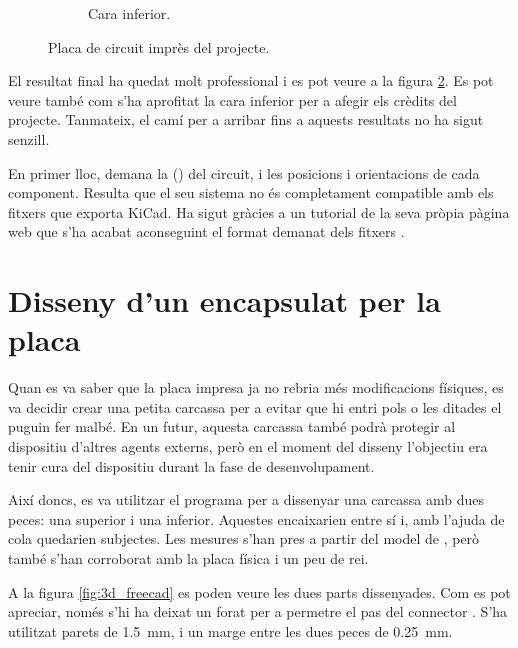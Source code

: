 \begin{figure}[ht]
\begin{subfigure}{0.45\textwidth}
        \caption{Cara inferior.}
        \label{fig:printedpcb_bottom}
    \end{subfigure}
    \caption{Placa de circuit imprès del projecte.}
    \label{fig:printedpcb}
\end{figure}

El resultat final ha quedat molt professional i es pot veure a la figura
\ref{fig:printedpcb}. Es pot veure també com s'ha aprofitat la cara inferior
per a afegir els crèdits del projecte. Tanmateix, el camí per a arribar fins
a aquests resultats no ha sigut senzill.

En primer lloc,  demana la  ()
del circuit, i les posicions i orientacions de cada component. Resulta que el
seu sistema no és completament compatible amb els fitxers que exporta
KiCad. Ha sigut gràcies a un tutorial de la seva pròpia pàgina web que s'ha
acabat aconseguint el format demanat dels fitxers \cite{KiCADJLC}.

\section{Disseny d'un encapsulat per la placa}

Quan es va saber que la placa impresa ja no rebria més modificacions físiques,
es va decidir crear una petita carcassa per a evitar que hi entri pols o les
ditades el puguin fer malbé. En un futur, aquesta carcassa també podrà protegir
al dispositiu d'altres agents externs, però en el moment del disseny l'objectiu
era tenir cura del dispositiu durant la fase de desenvolupament.

Així doncs, es va utilitzar el programa  per a dissenyar una
carcassa amb dues peces: una superior i una inferior. Aquestes encaixarien entre
sí i, amb l'ajuda de cola quedarien subjectes. Les mesures s'han pres a partir
del model de , però també s'han corroborat amb la placa física i un
peu de rei.

A la figura \ref{fig:3d_freecad} es poden veure les dues parts dissenyades. Com es pot
apreciar, només s'hi ha deixat un forat per a permetre el pas del connector
. S'ha utilitzat parets de \SI{1.5}{\milli\meter}, i un marge entre
les dues peces de \SI{0.25}{\milli\meter}.

